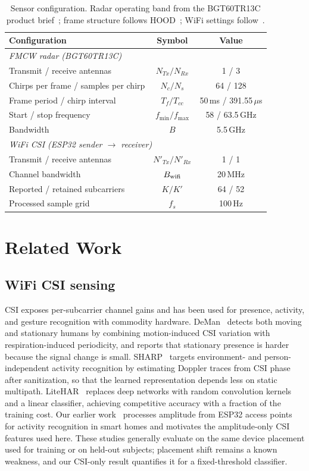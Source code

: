 \documentclass[conference,10pt,letterpaper]{IEEEtran}
\begin{document}
\begin{table}[!b]
\centering\footnotesize
\setlength{\tabcolsep}{3.5pt}
\caption{Sensor configuration. Radar operating band from the BGT60TR13C product brief~\cite{bgt60}; frame structure follows HOOD~\cite{hood}; WiFi settings follow~\cite{wifi}.}
\label{tab:radar}
\begin{tabular}{lcc}\toprule
Configuration & Symbol & Value\\\midrule
\multicolumn{3}{l}{\itshape FMCW radar (BGT60TR13C)}\\
Transmit / receive antennas & $N_{Tx}/N_{Rx}$ & 1 / 3\\
Chirps per frame / samples per chirp & $N_c/N_s$ & 64 / 128\\
Frame period / chirp interval & $T_f/T_{cc}$ & 50\,ms / 391.55\,$\mu$s\\
Start / stop frequency & $f_{\min}/f_{\max}$ & 58 / 63.5\,GHz\\
Bandwidth & $B$ & 5.5\,GHz\\\midrule
\multicolumn{3}{l}{\itshape WiFi CSI (ESP32 sender $\to$ receiver)}\\
Transmit / receive antennas & $N'_{Tx}/N'_{Rx}$ & 1 / 1\\
Channel bandwidth & $B_{\rm wifi}$ & 20\,MHz\\
Reported / retained subcarriers & $K/K'$ & 64 / 52\\
Processed sample grid & $f_s$ & 100\,Hz\\\bottomrule
\end{tabular}
\end{table}

\section{Related Work}
\subsection{WiFi CSI sensing}
CSI exposes per-subcarrier channel gains and has been used for presence, activity, and gesture recognition with commodity hardware. DeMan~\cite{deman} detects both moving and stationary humans by combining motion-induced CSI variation with respiration-induced periodicity, and reports that stationary presence is harder because the signal change is small. SHARP~\cite{sharp} targets environment- and person-independent activity recognition by estimating Doppler traces from CSI phase after sanitization, so that the learned representation depends less on static multipath. LiteHAR~\cite{litehar} replaces deep networks with random convolution kernels and a linear classifier, achieving competitive accuracy with a fraction of the training cost. Our earlier work~\cite{wifi} processes amplitude from ESP32 access points for activity recognition in smart homes and motivates the amplitude-only CSI features used here. These studies generally evaluate on the same device placement used for training or on held-out subjects; placement shift remains a known weakness, and our CSI-only result quantifies it for a fixed-threshold classifier.
\end{document}

